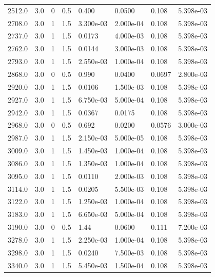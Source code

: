 \documentclass[preview]{standalone}
\begin{document}
{{\begin{tabular}{L{1.2cm}C{1.2cm} C{0.3cm}C{0.5cm} C{1.4cm}C{1.4cm} C{1.4cm}C{1.4cm}}
  2512.0  &   3.0  & 0     & 0.5 &  0.400  & 0.0500  & 0.108 &  5.398e-03   \\ 
  2708.0  &   3.0  & 1     & 1.5 &  3.300e-03  & 2.000e-04  & 0.108 &  5.398e-03   \\ 
  2737.0  &   3.0  & 1     & 1.5 &  0.0173  & 4.000e-03  & 0.108 &  5.398e-03   \\ 
  2762.0  &   3.0  & 1     & 1.5 &  0.0144  & 3.000e-03  & 0.108 &  5.398e-03   \\ 
  2793.0  &   3.0  & 1     & 1.5 &  2.550e-03  & 1.000e-04  & 0.108 &  5.398e-03   \\ 
  2868.0  &   3.0  & 0     & 0.5 &  0.990  & 0.0400  & 0.0697 &  2.800e-03   \\ 
  2920.0  &   3.0  & 1     & 1.5 &  0.0106  & 1.500e-03  & 0.108 &  5.398e-03   \\ 
  2927.0  &   3.0  & 1     & 1.5 &  6.750e-03  & 5.000e-04  & 0.108 &  5.398e-03   \\ 
  2942.0  &   3.0  & 1     & 1.5 &  0.0367  & 0.0175  & 0.108 &  5.398e-03   \\ 
  2968.0  &   3.0  & 0     & 0.5 &  0.692  & 0.0200  & 0.0576 &  3.000e-03   \\ 
  2987.0  &   3.0  & 1     & 1.5 &  2.150e-03  & 5.000e-05  & 0.108 &  5.398e-03   \\ 
  3009.0  &   3.0  & 1     & 1.5 &  1.450e-03  & 1.000e-04  & 0.108 &  5.398e-03   \\ 
  3086.0  &   3.0  & 1     & 1.5 &  1.350e-03  & 1.000e-04  & 0.108 &  5.398e-03   \\ 
  3095.0  &   3.0  & 1     & 1.5 &  0.0110  & 2.000e-03  & 0.108 &  5.398e-03   \\ 
  3114.0  &   3.0  & 1     & 1.5 &  0.0205  & 5.500e-03  & 0.108 &  5.398e-03   \\ 
  3122.0  &   3.0  & 1     & 1.5 &  1.250e-03  & 1.000e-04  & 0.108 &  5.398e-03   \\ 
  3183.0  &   3.0  & 1     & 1.5 &  6.650e-03  & 5.000e-04  & 0.108 &  5.398e-03   \\ 
  3190.0  &   3.0  & 0     & 0.5 &  1.44  & 0.0600  & 0.111 &  7.200e-03   \\ 
  3278.0  &   3.0  & 1     & 1.5 &  2.250e-03  & 1.000e-04  & 0.108 &  5.398e-03   \\ 
  3298.0  &   3.0  & 1     & 1.5 &  0.0240  & 7.500e-03  & 0.108 &  5.398e-03   \\ 
  3340.0  &   3.0  & 1     & 1.5 &  5.450e-03  & 1.500e-04  & 0.108 &  5.398e-03   \\ 

\end{tabular}}}
\end{document}
